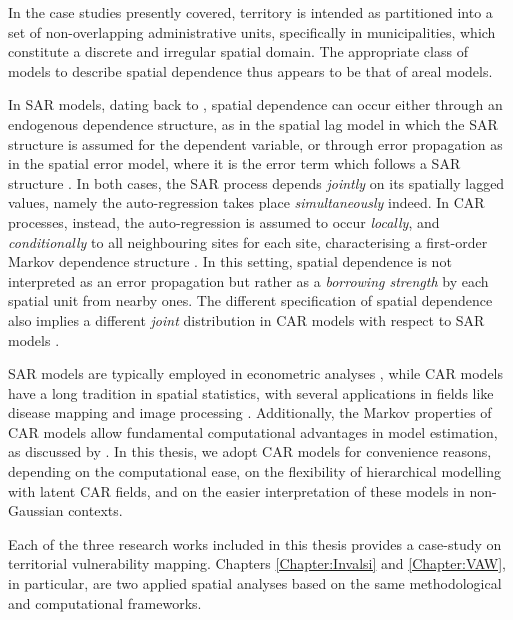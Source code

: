 \documentclass[openany, 11pt, oneside]{book}
\begin{document}
In the case studies presently covered, territory is intended as partitioned into a set of non-overlapping administrative units, specifically in municipalities, which constitute a discrete and irregular spatial domain. The appropriate class of models to describe spatial dependence thus appears to be that of areal models.

In SAR models, dating back to \textcite{Whittle}, spatial dependence can occur either through an endogenous dependence structure, as in the spatial lag model in which the SAR structure is assumed for the dependent variable, or through error propagation as in the spatial error model, where it is the error term which follows a SAR structure \parencite{Anselin1988}.  In both cases, the SAR process depends \textit{jointly} on its spatially lagged values, namely the auto-regression takes place \textit{simultaneously} indeed. In CAR processes, instead, the auto-regression is assumed to occur \textit{locally}, and \textit{conditionally} to all neighbouring sites for each site, characterising a first-order Markov dependence structure \parencite{CAR}. In this setting, spatial dependence is not interpreted as an error propagation but rather as a \textit{borrowing strength} by each spatial unit from nearby ones. The different specification of spatial dependence also implies a different \textit{joint} distribution in CAR models with respect to SAR models \parencite{Cressie1993}. 

SAR models are typically employed in econometric analyses \parencite[page 33][]{Anselin1988}, while CAR models have a long tradition in spatial statistics, with several applications in fields like disease mapping \parencite{Martinez-Beneito2019} and image processing \parencite{BYM}. Additionally, the Markov properties of CAR models allow fundamental computational advantages in model estimation, as discussed by \cite{GMRFs}. In this thesis, we adopt CAR models for convenience reasons, depending on the computational ease, on the flexibility of hierarchical modelling with latent CAR fields, and on the easier interpretation of these models in non-Gaussian contexts. 

Each of the three research works included in this thesis provides a case-study on territorial vulnerability mapping. Chapters \ref{Chapter:Invalsi} and \ref{Chapter:VAW}, in particular, are two applied spatial analyses based on the same methodological and computational frameworks. 
\end{document}
